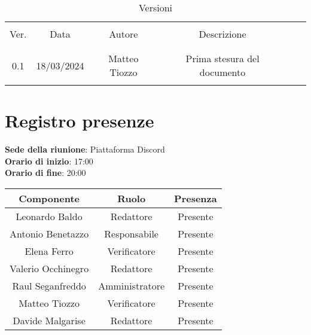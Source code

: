 \documentclass[italian,12pt]{article} %
\begin{document}


\newpage





\begin{table}[!h]
	\caption{Versioni}
	\begin{center}
		\begin{tabular}{ c c c c c c }
			\hline \\[-2ex]
			Ver. & Data & Autore & Descrizione \\
			\\[-2ex] \hline \\[-1.5ex]
			
			0.1 & 18/03/2024 & Matteo Tiozzo & Prima stesura del documento \\
			\\[-1.5ex] \hline
		\end{tabular}
	\end{center}
\end{table}
\newpage

\tableofcontents

\newpage

\section{Registro presenze}


\textbf{Sede della riunione}: Piattaforma Discord\\
\textbf{Orario di inizio}: 17:00\\
\textbf{Orario di fine}: 20:00\\

\begin{flushleft}
\begin{table}[!h]
\begin{tabular}{ |c|c|c| } 
	\hline
	\textbf{Componente} & \textbf{Ruolo} & \textbf{Presenza} \\
	\hline 
	Leonardo Baldo 		& Redattore & Presente \\ 
	Antonio Benetazzo 	& Responsabile & Presente \\
	Elena Ferro 		& Verificatore & Presente \\
	Valerio Occhinegro 	& Redattore & Presente \\
	Raul Seganfreddo 	& Amministratore & Presente \\
	Matteo Tiozzo 		& Verificatore & Presente \\ 
	Davide Malgarise 	& Redattore & Presente \\
	\hline
\end{tabular}
\end{table}
\end{flushleft}
\end{document}
